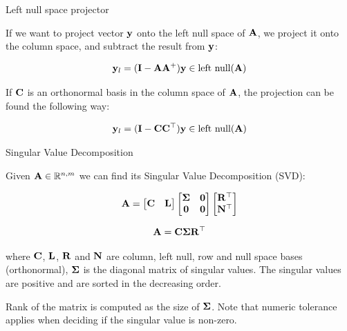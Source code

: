 \documentclass{beamer}
\begin{document}
\begin{frame}{Left null space projector}
	\begin{flushleft}
		
		If we want to project vector $\mathbf{y}$ onto the left null space of $\mathbf{A}$, we project it onto the column space, and subtract the result from $\mathbf{y}$:
		
		\begin{equation}
			\mathbf{y}_l = (\mathbf{I} - \mathbf{A}\mathbf{A}^+) \mathbf{y} \in \text{left null}(\mathbf{A})
		\end{equation}
		
		If $\mathbf{C}$ is an orthonormal basis in the column space of $\mathbf{A}$, the projection can be found the following way:
		
		\begin{equation}
			\mathbf{y}_l = (\mathbf{I} - \mathbf{C}\mathbf{C}^\top) \mathbf{y} \in \text{left null}(\mathbf{A})
		\end{equation}
		
		
	\end{flushleft}
\end{frame}



\begin{frame}{Singular Value Decomposition}
	\begin{flushleft}
		
		Given $\mathbf{A} \in \mathbb{R}^{n, m}$ we can find its Singular Value Decomposition (SVD):
		
		\begin{equation}
			\mathbf{A} = 
			\begin{bmatrix}
				\mathbf{C} & \mathbf{L}
			\end{bmatrix}
			\begin{bmatrix}
				\mathbf{\Sigma} & \mathbf{0} \\
				\mathbf{0} & \mathbf{0}
			\end{bmatrix}
			\begin{bmatrix}
				\mathbf{R}^\top \\ \mathbf{N}^\top
			\end{bmatrix}
		\end{equation}
		
		\begin{equation}
			\mathbf{A} = 
			\mathbf{C} \mathbf{\Sigma} \mathbf{R}^\top
		\end{equation}
		
		where $\mathbf{C}$, $\mathbf{L}$, $\mathbf{R}$ and $\mathbf{N}$ are column, left null, row and null space bases (orthonormal), $\mathbf{\Sigma}$ is the diagonal matrix of singular values. The singular values are positive and are sorted in the decreasing order.
		
		\bigskip

		Rank of the matrix is computed as the size of $\mathbf{\Sigma}$. Note that numeric tolerance applies when deciding if the singular value is non-zero.
		
	\end{flushleft}
\end{frame}
\end{document}
